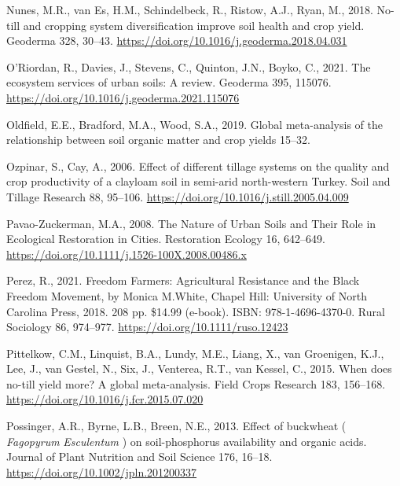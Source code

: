 \documentclass[
  12pt,
]{article}
\newlength{\cslhangindent}
\newlength{\cslentryspacingunit} %
\newenvironment{CSLReferences}[2] %
 {%
  \setlength{\parindent}{0pt}
  \ifodd #1
  \let\oldpar\par
  \def\par{\hangindent=\cslhangindent\oldpar}
  \fi
  \setlength{\parskip}{#2\cslentryspacingunit}
 }%
 {}
\begin{document}
\begin{CSLReferences}{1}{0}
\leavevmode{}%
Nunes, M.R., van Es, H.M., Schindelbeck, R., Ristow, A.J., Ryan, M., 2018. No-till and cropping system diversification improve soil health and crop yield. Geoderma 328, 30--43. \url{https://doi.org/10.1016/j.geoderma.2018.04.031}

\leavevmode{}%
O'Riordan, R., Davies, J., Stevens, C., Quinton, J.N., Boyko, C., 2021. The ecosystem services of urban soils: {A} review. Geoderma 395, 115076. \url{https://doi.org/10.1016/j.geoderma.2021.115076}

\leavevmode{}%
Oldfield, E.E., Bradford, M.A., Wood, S.A., 2019. Global meta-analysis of the relationship between soil organic matter and crop yields 15--32.

\leavevmode{}%
Ozpinar, S., Cay, A., 2006. Effect of different tillage systems on the quality and crop productivity of a clay\textendash loam soil in semi-arid north-western {Turkey}. Soil and Tillage Research 88, 95--106. \url{https://doi.org/10.1016/j.still.2005.04.009}

\leavevmode{}%
Pavao-Zuckerman, M.A., 2008. The {Nature} of {Urban Soils} and {Their Role} in {Ecological Restoration} in {Cities}. Restoration Ecology 16, 642--649. \url{https://doi.org/10.1111/j.1526-100X.2008.00486.x}

\leavevmode{}%
Perez, R., 2021. Freedom {Farmers}: {Agricultural Resistance} and the {Black Freedom Movement}, by {Monica M}.{White}, {Chapel Hill}: {University} of {North Carolina Press}, 2018. 208 pp. \$14.99 (e-book). {ISBN}: 978-1-4696-4370-0. Rural Sociology 86, 974--977. \url{https://doi.org/10.1111/ruso.12423}

\leavevmode{}%
Pittelkow, C.M., Linquist, B.A., Lundy, M.E., Liang, X., van Groenigen, K.J., Lee, J., van Gestel, N., Six, J., Venterea, R.T., van Kessel, C., 2015. When does no-till yield more? {A} global meta-analysis. Field Crops Research 183, 156--168. \url{https://doi.org/10.1016/j.fcr.2015.07.020}

\leavevmode{}%
Possinger, A.R., Byrne, L.B., Breen, N.E., 2013. Effect of buckwheat ( {\emph{Fagopyrum}}{ \emph{Esculentum}} ) on soil-phosphorus availability and organic acids. Journal of Plant Nutrition and Soil Science 176, 16--18. \url{https://doi.org/10.1002/jpln.201200337}


\end{CSLReferences}
\end{document}
